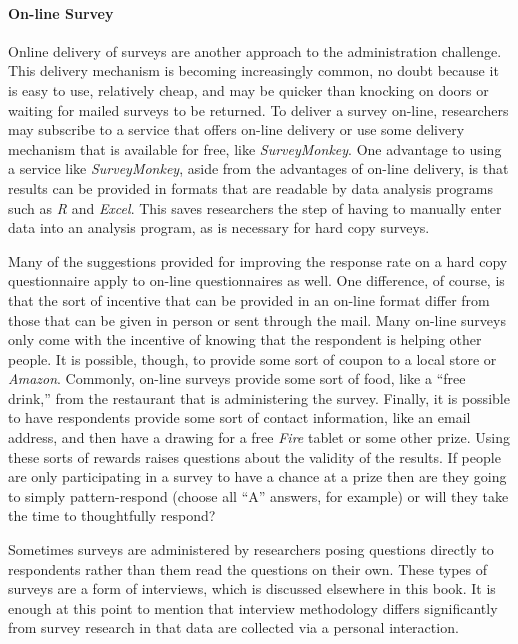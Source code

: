 \paragraph{On-line Survey}

Online delivery of surveys are another approach to the administration challenge. This delivery mechanism is becoming increasingly common, no doubt because it is easy to use, relatively cheap, and may be quicker than knocking on doors or waiting for mailed surveys to be returned. To deliver a survey on-line, researchers may subscribe to a service that offers on-line delivery or use some delivery mechanism that is available for free, like \textit{SurveyMonkey}. One advantage to using a service like \textit{SurveyMonkey}, aside from the advantages of on-line delivery, is that results can be provided in formats that are readable by data analysis programs such as \textit{R} and \textit{Excel}. This saves researchers the step of having to manually enter data into an analysis program, as is necessary for hard copy surveys.

Many of the suggestions provided for improving the response rate on a hard copy questionnaire apply to on-line questionnaires as well. One difference, of course, is that the sort of incentive that can be provided in an on-line format differ from those that can be given in person or sent through the mail. Many on-line surveys only come with the incentive of knowing that the respondent is helping other people. It is possible, though, to provide some sort of coupon to a local store or \textit{Amazon}. Commonly, on-line surveys provide some sort of food, like a ``free drink,'' from the restaurant that is administering the survey. Finally, it is possible to have respondents provide some sort of contact information, like an email address, and then have a drawing for a free \textit{Fire} tablet or some other prize. Using these sorts of rewards raises questions about the validity of the results. If people are only participating in a survey to have a chance at a prize then are they going to simply pattern-respond (choose all ``A'' answers, for example) or will they take the time to thoughtfully respond?

Sometimes surveys are administered by researchers posing questions directly to respondents rather than them read the questions on their own. These types of surveys are a form of interviews, which is discussed elsewhere in this book. It is enough at this point to mention that interview methodology differs significantly from survey research in that data are collected via a personal interaction. 

